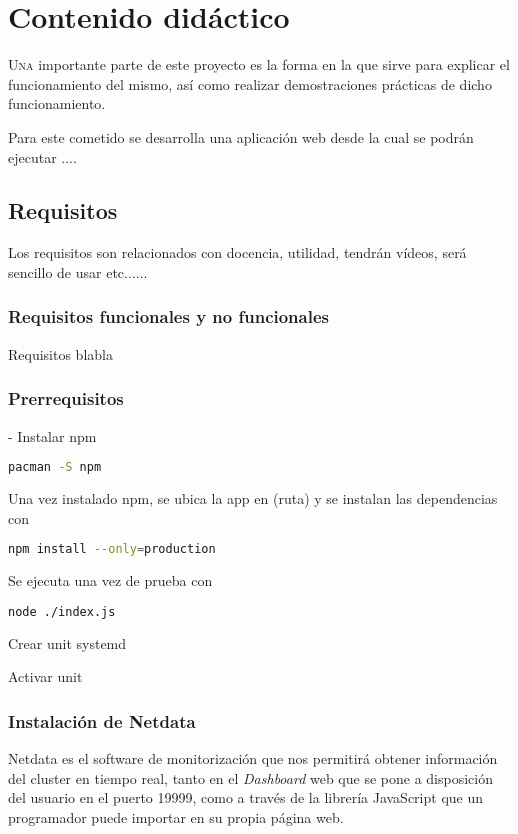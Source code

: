 \chapter{Contenido didáctico}
\label{chap:contenido_didactico}

\lettrine{U}{na} importante parte de este proyecto es la forma en la que sirve para explicar el funcionamiento del mismo, así como realizar demostraciones prácticas de dicho funcionamiento.

Para este cometido se desarrolla una aplicación web desde la cual se podrán ejecutar ....

\section{Requisitos}
Los requisitos son relacionados con docencia, utilidad, tendrán vídeos, será sencillo de usar etc......

\subsection{Requisitos funcionales y no funcionales}
Requisitos blabla

\subsection{Prerrequisitos}
- Instalar npm

\begin{lstlisting}[language=bash]
pacman -S npm
\end{lstlisting}

Una vez instalado npm, se ubica la app en (ruta) y se instalan las dependencias con
\begin{lstlisting}[language=bash]
npm install --only=production
\end{lstlisting}

Se ejecuta una vez de prueba con
\begin{lstlisting}[language=bash]
node ./index.js
\end{lstlisting}

Crear unit systemd

Activar unit

\subsection{Instalación de Netdata}
Netdata es el software de monitorización que nos permitirá obtener información del cluster en tiempo real, tanto en el \textit{Dashboard} web que se pone a disposición del usuario en el puerto 19999, como a través de la librería JavaScript que un programador puede importar en su propia página web.

